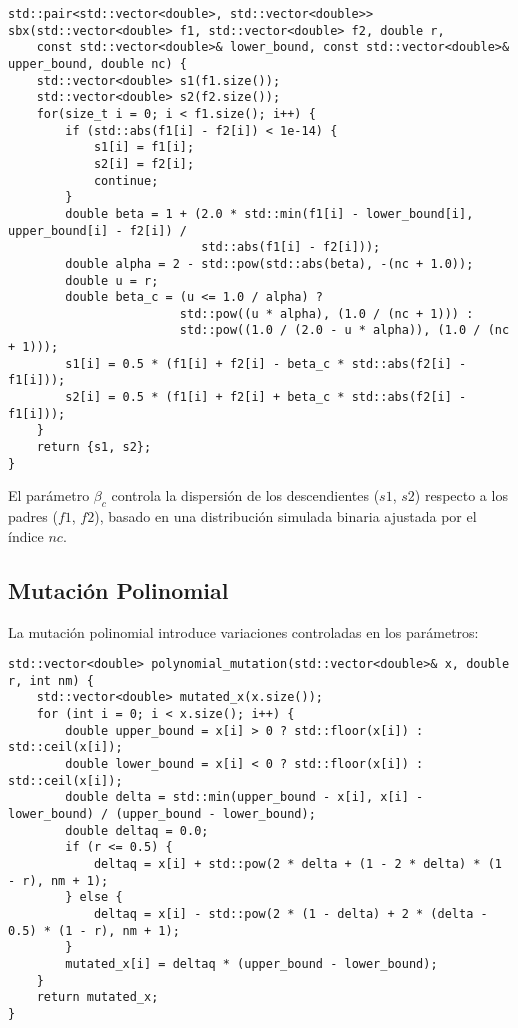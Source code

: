 \begin{lstlisting}[style=cppstyle, caption={Cruce SBX}, label={lst:sbx}]
std::pair<std::vector<double>, std::vector<double>> sbx(std::vector<double> f1, std::vector<double> f2, double r, 
    const std::vector<double>& lower_bound, const std::vector<double>& upper_bound, double nc) {
    std::vector<double> s1(f1.size());
    std::vector<double> s2(f2.size());
    for(size_t i = 0; i < f1.size(); i++) {
        if (std::abs(f1[i] - f2[i]) < 1e-14) {
            s1[i] = f1[i];
            s2[i] = f2[i];
            continue;
        }
        double beta = 1 + (2.0 * std::min(f1[i] - lower_bound[i], upper_bound[i] - f2[i]) / 
                           std::abs(f1[i] - f2[i]));
        double alpha = 2 - std::pow(std::abs(beta), -(nc + 1.0));
        double u = r;
        double beta_c = (u <= 1.0 / alpha) ? 
                        std::pow((u * alpha), (1.0 / (nc + 1))) : 
                        std::pow((1.0 / (2.0 - u * alpha)), (1.0 / (nc + 1)));
        s1[i] = 0.5 * (f1[i] + f2[i] - beta_c * std::abs(f2[i] - f1[i]));
        s2[i] = 0.5 * (f1[i] + f2[i] + beta_c * std::abs(f2[i] - f1[i]));
    }
    return {s1, s2};
}
\end{lstlisting}

El parámetro \(\beta_c\) controla la dispersión de los descendientes (\(s1\), \(s2\)) respecto a los padres (\(f1\), \(f2\)), basado en una distribución simulada binaria ajustada por el índice \(nc\).

\subsection{Mutación Polinomial}
\label{subsec:mutacion_polinomial}

La mutación polinomial introduce variaciones controladas en los parámetros:

\begin{lstlisting}[style=cppstyle, caption={Mutación polinomial}, label={lst:poly_mut}]
std::vector<double> polynomial_mutation(std::vector<double>& x, double r, int nm) {
    std::vector<double> mutated_x(x.size());
    for (int i = 0; i < x.size(); i++) {
        double upper_bound = x[i] > 0 ? std::floor(x[i]) : std::ceil(x[i]);
        double lower_bound = x[i] < 0 ? std::floor(x[i]) : std::ceil(x[i]);
        double delta = std::min(upper_bound - x[i], x[i] - lower_bound) / (upper_bound - lower_bound);
        double deltaq = 0.0;
        if (r <= 0.5) {
            deltaq = x[i] + std::pow(2 * delta + (1 - 2 * delta) * (1 - r), nm + 1);
        } else {
            deltaq = x[i] - std::pow(2 * (1 - delta) + 2 * (delta - 0.5) * (1 - r), nm + 1);
        }
        mutated_x[i] = deltaq * (upper_bound - lower_bound);
    }
    return mutated_x;
}
\end{lstlisting}


